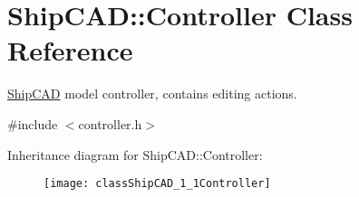 \hypertarget{classShipCAD_1_1Controller}{}\section{Ship\+C\+AD\+:\+:Controller Class Reference}
\label{classShipCAD_1_1Controller}


\hyperlink{namespaceShipCAD}{Ship\+C\+AD} model controller, contains editing actions.  




{\ttfamily \#include $<$controller.\+h$>$}

Inheritance diagram for Ship\+C\+AD\+:\+:Controller\+:\begin{figure}[H]
\begin{center}
\leavevmode
\texttt{[image: classShipCAD\_1\_1Controller]}
\end{center}
\end{figure}
